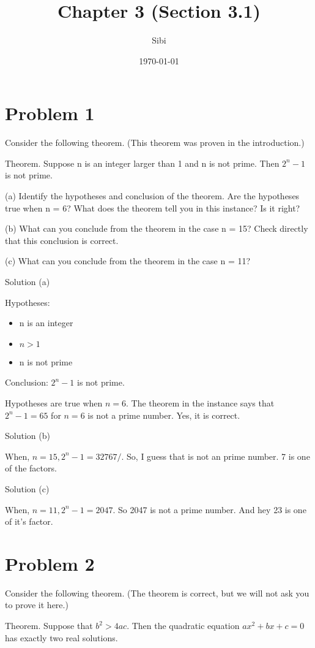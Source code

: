 \documentclass{article}
\begin{document}
\title{Chapter 3 (Section 3.1)}
\author{Sibi}
\date{\today}
\maketitle
\newpage

\section{Problem 1}
Consider the following theorem. (This theorem was proven in the
introduction.)

Theorem. Suppose n is an integer larger than 1 and n is not prime.
Then $2^n - 1$  is not prime.

(a) Identify the hypotheses and conclusion of the theorem. Are the
hypotheses true when n = 6? What does the theorem tell you in this
instance? Is it right?

(b) What can you conclude from the theorem in the case n = 15? Check
directly that this conclusion is correct.

(c) What can you conclude from the theorem in the case n = 11?

Solution (a)

Hypotheses:
\begin{itemize}
\item n is an integer
\item $n > 1$
\item n is not prime
\end{itemize}

Conclusion:
$2^n - 1$ is not prime.

Hypotheses are true when $n = 6$. The theorem in the instance says
that $2^n - 1 = 65$ for $n=6$ is not a prime number. Yes, it is
correct.

Solution (b)

When, $n=15, 2^n - 1 = 32767/$. So, I guess that is not an prime
number. 7 is one of the factors.

Solution (c)

When, $n=11, 2^n - 1 = 2047$. So 2047 is not a prime number. And hey
23 is one of it's factor.

\section{Problem 2}
Consider the following theorem. (The theorem is correct, but we will not
ask you to prove it here.)

Theorem. Suppose that $b^2 > 4ac$. Then the quadratic equation $ax^2 +
bx + c = 0$ has exactly two real solutions.
\end{document}

